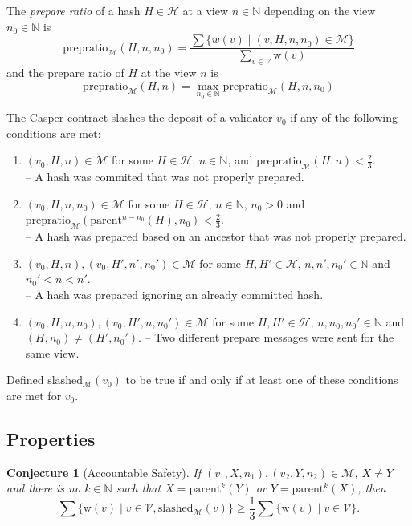 \documentclass[11pt,letterpaper]{article}
\newtheorem{conjecture}[dummytheorem]{Conjecture}
\newcommand{\uint}{\mathbb{N}}
\newcommand{\validators}{\mathcal{V}}
\newcommand{\messages}{\mathcal{M}}
\begin{document}
The \emph{prepare ratio} of a hash $H \in \mathcal{H}$ at a view $n \in \uint$ depending
on the view $n_0 \in \uint$ is
\[
\mathrm{prepratio}_{\messages}(H, n, n_0) =
\frac{\sum\{w(v) \mid (v, H, n, n_0) \in \messages \}}{\sum_{v \in \validators}\mathrm{w}(v)}
\]
and the prepare ratio of $H$ at the view $n$ is
\[
\mathrm{prepratio}_{\messages}(H, n) = \max_{n_0 \in \uint} \mathrm{prepratio}_\messages(H, n, n_0)
\]

The Casper contract slashes the deposit of a validator $v_0$ if any of the following conditions
are met:

\begin{enumerate}
\item $(v_0, H, n) \in \messages$ for some $H \in \mathcal{H}$, $n \in \uint$,
and $\mathrm{prepratio}_\messages(H, n) < \frac{2}{3}$.\\
-- A hash was commited that was not properly prepared.
\item $(v_0, H, n, n_0) \in \messages$ for some $H \in \mathcal{H}$, $n \in \uint$,
$n_0 > 0$ and $\mathrm{prepratio}_\messages(\mathrm{parent}^{n-n_0}(H), n_0) < \frac{2}{3}$.\\
-- A hash was prepared based on an ancestor that was not properly prepared.
\item $(v_0, H, n), (v_0, H', n', n_0') \in \messages$ for some $H,H' \in \mathcal{H}$, $n, n', n_0' \in \uint$
and $n_0' < n < n'$.\\
-- A hash was prepared ignoring an already committed hash.
\item $(v_0, H, n, n_0), (v_0, H', n, n_0') \in \messages$ for some $H, H' \in \mathcal{H}$,
$n, n_0, n_0' \in \uint$ and $(H, n_0) \neq (H', n_0')$.
-- Two different prepare messages were sent for the same view.
\end{enumerate}

Defined $\mathrm{slashed}_\messages(v_0)$ to be true if and only if at least
one of these conditions are met for $v_0$.

\subsection*{Properties}

\begin{conjecture}[Accountable Safety]
If $(v_1, X, n_1), (v_2, Y, n_2) \in \messages$, $X \neq Y$ and there is no
$k \in \uint$ such that $X = \mathrm{parent}^k(Y)$ or $Y = \mathrm{parent}^k(X)$,
then
\[
  \sum\{\mathrm{w}(v) \mid v \in \mathcal{V}, \mathrm{slashed}_\messages(v)\}
  \ge \frac{1}{3} \sum\{\mathrm{w}(v) \mid v \in \mathcal{V}\}.
\]
\end{conjecture}
\end{document}
